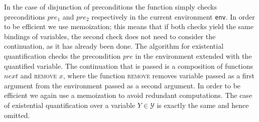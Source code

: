 In the case of disjunction of preconditions the function simply checks
preconditions $pre_1$ and $pre_2$ respectively in the current
environment \texttt{env}. In order to be efficient we use memoization;
this means that if both checks yield the same bindings of variables,
the second check does not need to consider the continuation, as it has
already been done.
The algorithm for existential quantification checks the precondition
$pre$ in the environment extended with the quantified variable. The
continuation that is passed is a composition of functions $next$ and
\textsc{remove} $x$, where the function \textsc{remove} removes
variable passed as a first argument from the environment passed as a
second argument. In order to be efficient we again use a memoization
to avoid redundant computations. The case of existential
quantification over a variable $Y \in \mathcal{Y}$ is exactly the same
and hence omitted.
